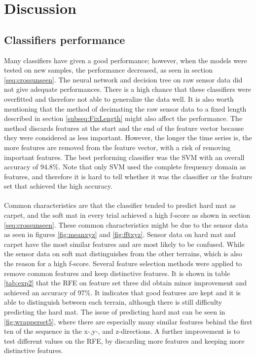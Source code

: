 \documentclass[USenglish]{ifimaster}  %
\begin{document}
\chapter{Discussion}
\section{Classifiers performance}
Many classifiers have given a good performance; however, when the models were tested on new samples, the performance decreased, as seen in section \ref{seq:crossunseen}. The neural network and decision tree on raw sensor data did not give adequate performances. There is a high chance that these classifiers were overfitted and therefore not able to generalize the data well. It is also worth mentioning that the method of decimating the raw sensor data to a fixed length described in section \ref{subseq:FixLength} might also affect the performance. The method discards features at the start and the end of the feature vector because they were considered as less important. However, the longer the time series is, the more features are removed from the feature vector, with a risk of removing important features. The best performing classifier was the SVM with an overall accuracy of 94.8\%. Note that only SVM used the complete frequency domain as features, and therefore it is hard to tell whether it was the classifier or the feature set that achieved the high accuracy.  
\\
\\
Common characteristics are that the classifier tended to predict hard mat as carpet, and the soft mat in every trial achieved a high f-score as shown in section \ref{seq:crossunseen}. These common characteristics might be due to the sensor data as seen in figures \ref{fig:meanxyz} and \ref{fig:fftxyz}. Sensor data on hard mat and carpet have the most similar features and are most likely to be confused. While the sensor data on soft mat distinguishes from the other terrains, which is also the reason for a high f-score. Several feature selection methods were applied to remove common features and keep distinctive features. It is shown in table \ref{tab:exp2} that the RFE on feature set three did obtain minor improvement and achieved an accuracy of 97\%. It indicates that good features are kept and it is able to distinguish between each terrain, although there is still difficulty predicting the hard mat. The issue of predicting hard mat can be seen in \ref{fig:wrapperset5}, where there are especially many similar features behind the first ten of the sequence in the x-,y-, and z-directions. A further improvement is to test different values on the RFE, by discarding more features and keeping more distinctive features.
	
\end{document}
